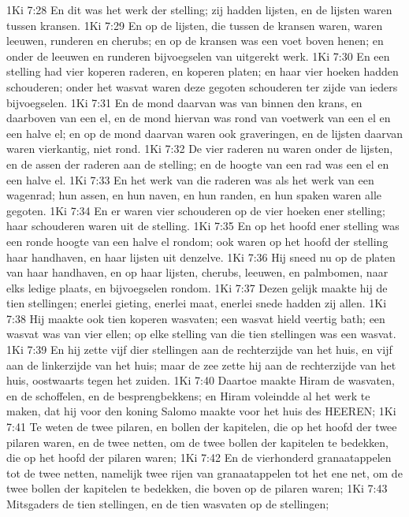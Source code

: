 1Ki 7:28  En dit was het werk der stelling; zij hadden lijsten, en de lijsten waren tussen kransen.
1Ki 7:29  En op de lijsten, die tussen de kransen waren, waren leeuwen, runderen en cherubs; en op de kransen was een voet boven henen; en onder de leeuwen en runderen bijvoegselen van uitgerekt werk.
1Ki 7:30  En een stelling had vier koperen raderen, en koperen platen; en haar vier hoeken hadden schouderen; onder het wasvat waren deze gegoten schouderen ter zijde van ieders bijvoegselen.
1Ki 7:31  En de mond daarvan was van binnen den krans, en daarboven van een el, en de mond hiervan was rond van voetwerk van een el en een halve el; en op de mond daarvan waren ook graveringen, en de lijsten daarvan waren vierkantig, niet rond.
1Ki 7:32  De vier raderen nu waren onder de lijsten, en de assen der raderen aan de stelling; en de hoogte van een rad was een el en een halve el.
1Ki 7:33  En het werk van die raderen was als het werk van een wagenrad; hun assen, en hun naven, en hun randen, en hun spaken waren alle gegoten.
1Ki 7:34  En er waren vier schouderen op de vier hoeken ener stelling; haar schouderen waren uit de stelling.
1Ki 7:35  En op het hoofd ener stelling was een ronde hoogte van een halve el rondom; ook waren op het hoofd der stelling haar handhaven, en haar lijsten uit denzelve.
1Ki 7:36  Hij sneed nu op de platen van haar handhaven, en op haar lijsten, cherubs, leeuwen, en palmbomen, naar elks ledige plaats, en bijvoegselen rondom.
1Ki 7:37  Dezen gelijk maakte hij de tien stellingen; enerlei gieting, enerlei maat, enerlei snede hadden zij allen.
1Ki 7:38  Hij maakte ook tien koperen wasvaten; een wasvat hield veertig bath; een wasvat was van vier ellen; op elke stelling van die tien stellingen was een wasvat.
1Ki 7:39  En hij zette vijf dier stellingen aan de rechterzijde van het huis, en vijf aan de linkerzijde van het huis; maar de zee zette hij aan de rechterzijde van het huis, oostwaarts tegen het zuiden.
1Ki 7:40  Daartoe maakte Hiram de wasvaten, en de schoffelen, en de besprengbekkens; en Hiram voleindde al het werk te maken, dat hij voor den koning Salomo maakte voor het huis des HEEREN;
1Ki 7:41  Te weten de twee pilaren, en bollen der kapitelen, die op het hoofd der twee pilaren waren, en de twee netten, om de twee bollen der kapitelen te bedekken, die op het hoofd der pilaren waren;
1Ki 7:42  En de vierhonderd granaatappelen tot de twee netten, namelijk twee rijen van granaatappelen tot het ene net, om de twee bollen der kapitelen te bedekken, die boven op de pilaren waren;
1Ki 7:43  Mitsgaders de tien stellingen, en de tien wasvaten op de stellingen;
